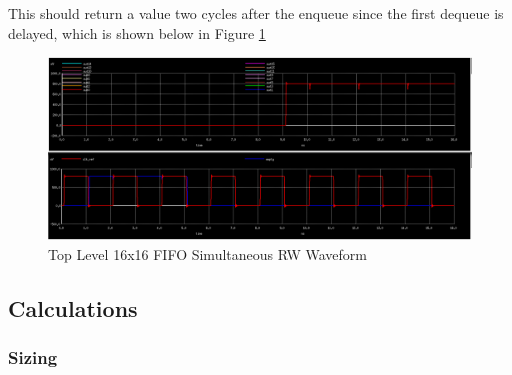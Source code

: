 \documentclass[a4paper]{article}
\begin{document}
This should return a value two cycles after the enqueue since the first dequeue is delayed, which is shown below in Figure \ref{fig:topLevelTestEnqAndDeq}

\begin{figure}[H]
	\centering
	\includegraphics[scale=0.25]{topLevelTestEnqAndDeq}
	\caption{Top Level 16x16 FIFO Simultaneous RW Waveform}
	\label{fig:topLevelTestEnqAndDeq}
\end{figure}




\subsection{Calculations}
\label{sec:calculations}

\subsubsection{Sizing}
\label{subsec:sizing_calc}
\end{document}
